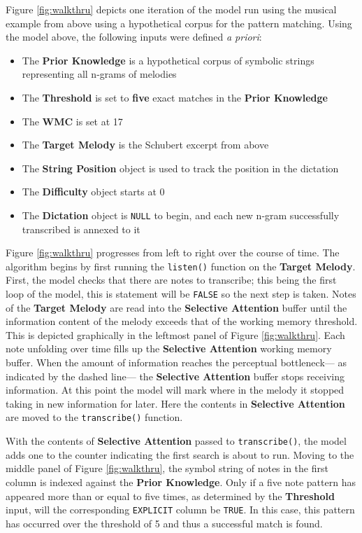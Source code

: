 \documentclass[12pt,]{book}
\providecommand{\tightlist}{%
  \setlength{\itemsep}{0pt}\setlength{\parskip}{0pt}}
\begin{document}
Figure \ref{fig:walkthru} depicts one iteration of the model run using the musical example from above using a hypothetical corpus for the pattern matching.
Using the model above, the following inputs were defined \emph{a priori}:

\begin{itemize}
\tightlist
\item
  The \textbf{Prior Knowledge} is a hypothetical corpus of symbolic strings representing all n-grams of melodies
\item
  The \textbf{Threshold} is set to \textbf{five} exact matches in the \textbf{Prior Knowledge}
\item
  The \textbf{WMC} is set at 17
\item
  The \textbf{Target Melody} is the Schubert excerpt from above
\item
  The \textbf{String Position} object is used to track the position in the dictation
\item
  The \textbf{Difficulty} object starts at 0
\item
  The \textbf{Dictation} object is \texttt{NULL} to begin, and each new n-gram successfully transcribed is annexed to it
\end{itemize}

Figure \ref{fig:walkthru} progresses from left to right over the course of time.
The algorithm begins by first running the \texttt{listen()} function on the \textbf{Target Melody}.
First, the model checks that there are notes to transcribe; this being the first loop of the model, this is statement will be \texttt{FALSE} so the next step is taken.
Notes of the \textbf{Target Melody} are read into the \textbf{Selective Attention} buffer until the information content of the melody exceeds that of the working memory threshold.
This is depicted graphically in the leftmost panel of Figure \ref{fig:walkthru}.
Each note unfolding over time fills up the \textbf{Selective Attention} working memory buffer.
When the amount of information reaches the perceptual bottleneck--- as indicated by the dashed line--- the \textbf{Selective Attention} buffer stops receiving information.
At this point the model will mark where in the melody it stopped taking in new information for later.
Here the contents in \textbf{Selective Attention} are moved to the \texttt{transcribe()} function.

With the contents of \textbf{Selective Attention} passed to \texttt{transcribe()}, the model adds one to the counter indicating the first search is about to run.
Moving to the middle panel of Figure \ref{fig:walkthru}, the symbol string of notes in the first column is indexed against the \textbf{Prior Knowledge}.
Only if a five note pattern has appeared more than or equal to five times, as determined by the \textbf{Threshold} input, will the corresponding \texttt{EXPLICIT} column be \texttt{TRUE}.
In this case, this pattern has occurred over the threshold of 5 and thus a successful match is found.
\end{document}
